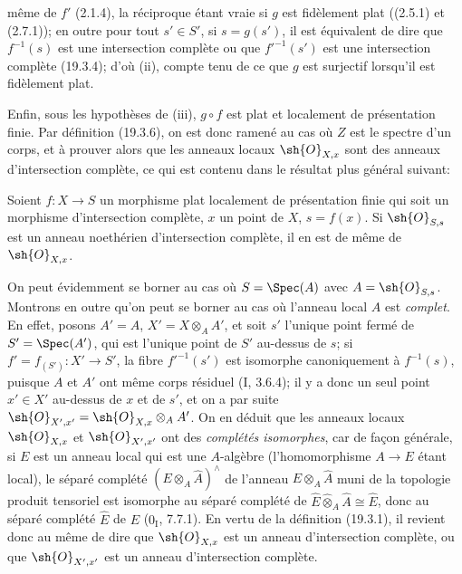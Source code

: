 
même de $f'$ (2.1.4), la réciproque étant vraie si $g$ est fidèlement plat ((2.5.1) et (2.7.1)); en outre pour tout $s'\in S'$, si $s=g(s')$, il est équivalent de dire que $f^{-1}(s)$ est une intersection complète ou que $f'^{-1}(s')$ est une intersection complète (19.3.4); d'où (ii), compte tenu de ce que $g$ est surjectif lorsqu'il est fidèlement plat.

Enfin, sous les hypothèses de (iii), $g\circ f$ est plat et localement de présentation finie. Par définition (19.3.6), on est donc ramené au cas où $Z$ est le spectre d'un corps, et à prouver alors que les anneaux locaux $\sh{O}_{X,x}$ sont des anneaux d'intersection complète, ce qui est contenu dans le résultat plus général suivant:

\begin{corollary}[19.3.10]
\label{IV.19.3.10}
Soient $f:X\to S$ un morphisme plat localement de présentation finie qui soit un morphisme d'intersection complète, $x$ un point de $X$, $s=f(x)$. Si $\sh{O}_{S,s}$ est un anneau noethérien d'intersection complète, il en est de même de $\sh{O}_{X,x}$.
\end{corollary}

On peut évidemment se borner au cas où $S=\Spec(A)$ avec $A=\sh{O}_{S,s}$. Montrons en outre qu'on peut se borner au cas où l'anneau local $A$ est \emph{complet}. En effet, posons $A'=\widehat A$, $X'=X\otimes_A A'$, et soit $s'$ l'unique point fermé de $S'=\Spec(A')$, qui est l'unique point de $S'$ au-dessus de $s$; si $f'=f_{(S')}:X'\to S'$, la fibre $f'^{-1}(s')$ est isomorphe canoniquement à $f^{-1}(s)$, puisque $A$ et $A'$ ont même corps résiduel (I, 3.6.4); il y a donc un seul point $x'\in X'$ au-dessus de $x$ et de $s'$, et on a par suite $\sh{O}_{X',x'}=\sh{O}_{X,x}\otimes_A A'$. On en déduit que les anneaux locaux $\sh{O}_{X,x}$ et $\sh{O}_{X',x'}$ ont des \emph{complétés isomorphes}, car de façon générale, si $E$ est un anneau local qui est une $A$-algèbre (l'homomorphisme $A\to E$ étant local), le séparé complété $(E\otimes_A\widehat A)^{\wedge}$ de l'anneau $E\otimes_A\widehat A$ muni de la topologie produit tensoriel est isomorphe au séparé complété de $\widehat E\widehat\otimes_A\widehat A\cong\widehat E$, donc au séparé complété $\widehat E$ de $E$ ($0_{\mathrm I}$, 7.7.1). En vertu de la définition (19.3.1), il revient donc au même de dire que $\sh{O}_{X,x}$ est un anneau d'intersection complète, ou que $\sh{O}_{X',x'}$ est un anneau d'intersection complète.

